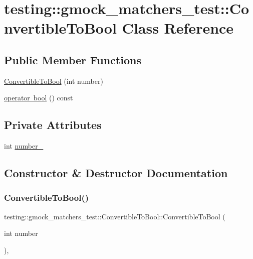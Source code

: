 \hypertarget{classtesting_1_1gmock__matchers__test_1_1_convertible_to_bool}{}\section{testing\+::gmock\+\_\+matchers\+\_\+test\+::Convertible\+To\+Bool Class Reference}
\label{classtesting_1_1gmock__matchers__test_1_1_convertible_to_bool}
\subsection*{Public Member Functions}
\begin{DoxyCompactItemize}
\item 
\mbox{\hyperlink{classtesting_1_1gmock__matchers__test_1_1_convertible_to_bool_a4e01a99e144a393bc11a40fb43e8a6f1}{Convertible\+To\+Bool}} (int number)
\item 
\mbox{\hyperlink{classtesting_1_1gmock__matchers__test_1_1_convertible_to_bool_a4ad9766b9d5179a1207af2449405f071}{operator bool}} () const
\end{DoxyCompactItemize}
\subsection*{Private Attributes}
\begin{DoxyCompactItemize}
\item 
int \mbox{\hyperlink{classtesting_1_1gmock__matchers__test_1_1_convertible_to_bool_ada38cee1b8eef8e499ec249711c4c6a6}{number\+\_\+}}
\end{DoxyCompactItemize}


\subsection{Constructor \& Destructor Documentation}
\mbox{\label{classtesting_1_1gmock__matchers__test_1_1_convertible_to_bool_a4e01a99e144a393bc11a40fb43e8a6f1}} 
\subsubsection{\texorpdfstring{ConvertibleToBool()}{ConvertibleToBool()}}
{\footnotesize\ttfamily testing\+::gmock\+\_\+matchers\+\_\+test\+::\+Convertible\+To\+Bool\+::\+Convertible\+To\+Bool (\begin{DoxyParamCaption}\item[{int}]{number }\end{DoxyParamCaption})\hspace{0.3cm}{\ttfamily [inline]}, {\ttfamily [explicit]}}



